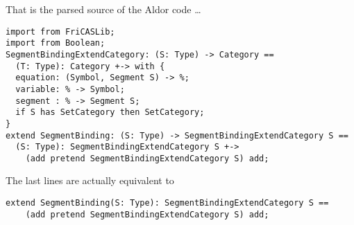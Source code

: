 \documentclass{article}
\begin{document}
That is the parsed source of the Aldor code \ldots
\begin{verbatim}
import from FriCASLib;
import from Boolean;
SegmentBindingExtendCategory: (S: Type) -> Category ==
  (T: Type): Category +-> with {
  equation: (Symbol, Segment S) -> %;
  variable: % -> Symbol;
  segment : % -> Segment S;
  if S has SetCategory then SetCategory;
}
extend SegmentBinding: (S: Type) -> SegmentBindingExtendCategory S ==
  (S: Type): SegmentBindingExtendCategory S +->
    (add pretend SegmentBindingExtendCategory S) add;
\end{verbatim}
The last lines are actually equivalent to
\begin{verbatim}
extend SegmentBinding(S: Type): SegmentBindingExtendCategory S ==
    (add pretend SegmentBindingExtendCategory S) add;
\end{verbatim}
\end{document}
